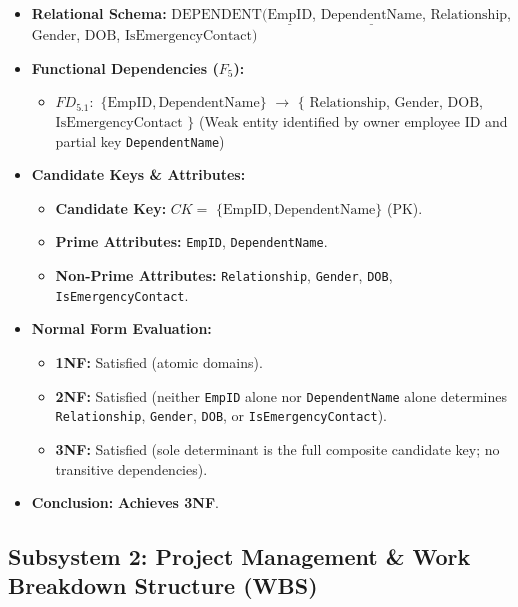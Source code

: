 \documentclass[a4paper,12pt]{report}
\providecommand{\tightlist}{%
  \setlength{\itemsep}{0pt}\setlength{\parskip}{0pt}}
\begin{document}
\begin{itemize}
\item
  \textbf{Relational Schema:} \(\text{DEPENDENT}(\underline{\text{EmpID}}\), \(\underline{\text{DependentName}}\), \(\text{Relationship}\), \(\text{Gender}\), \(\text{DOB}\), \(\text{IsEmergencyContact})\)
\item
  \textbf{Functional Dependencies (\(F_{5}\)):}

  \begin{itemize}
  \tightlist
  \item
    \(FD_{5.1}:\) \(\{\text{EmpID}, \text{DependentName}\}\) \(\rightarrow\) \(\{\) \(\text{Relationship}\), \(\text{Gender}\), \(\text{DOB}\), \(\text{IsEmergencyContact}\) \(\}\) (Weak entity identified by owner employee ID and partial key \texttt{DependentName})
  \end{itemize}
\item
  \textbf{Candidate Keys \& Attributes:}

  \begin{itemize}
  \item
    \textbf{Candidate Key:} \(CK =\) \(\{\text{EmpID}, \text{DependentName}\}\) (PK).
  \item
    \textbf{Prime Attributes:} \texttt{EmpID}, \texttt{DependentName}.
  \item
    \textbf{Non-Prime Attributes:} \texttt{Relationship}, \texttt{Gender}, \texttt{DOB}, \texttt{IsEmergencyContact}.
  \end{itemize}
\item
  \textbf{Normal Form Evaluation:}

  \begin{itemize}
  \item
    \textbf{1NF:} Satisfied (atomic domains).
  \item
    \textbf{2NF:} Satisfied (neither \texttt{EmpID} alone nor \texttt{DependentName} alone determines \texttt{Relationship}, \texttt{Gender}, \texttt{DOB}, or \texttt{IsEmergencyContact}).
  \item
    \textbf{3NF:} Satisfied (sole determinant is the full composite candidate key; no transitive dependencies).
  \end{itemize}
\item
  \textbf{Conclusion:} \textbf{Achieves 3NF}.
\end{itemize}

\subsection{Subsystem 2: Project Management \& Work Breakdown Structure (WBS)}\label{subsystem-2-project-management-work-breakdown-structure-wbs}
\end{document}
